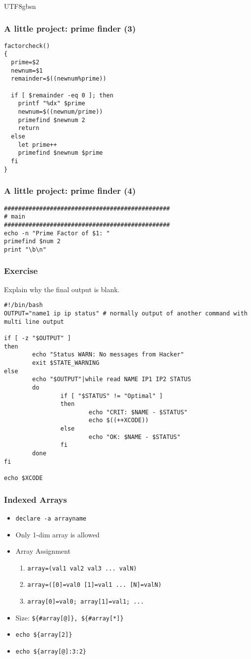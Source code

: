 \documentclass[red]{beamer}
\newcommand*{\lstverb}{\lstinline[style=caret]}
\begin{document}
\begin{CJK*}{UTF8}{gbsn}
\begin{frame}
\frametitle{A little project: prime finder (3)}
\begin{lstlisting}
factorcheck()
{
  prime=$2
  newnum=$1
  remainder=$((newnum%prime))

  if [ $remainder -eq 0 ]; then
    printf "%dx" $prime
    newnum=$((newnum/prime))
    primefind $newnum 2
    return
  else
    let prime++
    primefind $newnum $prime
  fi
}
\end{lstlisting}
\end{frame}

\begin{frame}
\frametitle{A little project: prime finder (4)}
\begin{lstlisting}
###############################################
# main
###############################################
echo -n "Prime Factor of $1: "
primefind $num 2
print "\b\n"
\end{lstlisting}
\end{frame}

\begin{frame}
\frametitle{Exercise}
Explain why the final output is blank.
\begin{lstlisting}[basicstyle=\scriptsize\ttfamily]
#!/bin/bash
OUTPUT="name1 ip ip status" # normally output of another command with multi line output

if [ -z "$OUTPUT" ]
then
        echo "Status WARN: No messages from Hacker"
        exit $STATE_WARNING
else
        echo "$OUTPUT"|while read NAME IP1 IP2 STATUS
        do
                if [ "$STATUS" != "Optimal" ]
                then
                        echo "CRIT: $NAME - $STATUS"
                        echo $((++XCODE))
                else
                        echo "OK: $NAME - $STATUS"
                fi
        done
fi

echo $XCODE
\end{lstlisting}
\end{frame}

\begin{frame}
\frametitle{Indexed Arrays}
\begin{itemize}
	\item \lstverb|declare -a arrayname|
	\item Only 1-dim array is allowed
	\item Array Assignment
	\begin{enumerate}
		\item \lstverb|array=(val1 val2 val3 ... valN)|
		\item \lstverb|array=([0]=val0 [1]=val1 ... [N]=valN)|
		\item \lstverb|array[0]=val0; array[1]=val1; ...|
	\end{enumerate}
	\item Size: \lstverb|${#array[@]}, ${#array[*]}|
	\item \lstverb|echo ${array[2]}|
	\item \lstverb|echo ${array[@]:3:2}| 
\end{itemize}
\end{frame}


\end{CJK*}
\end{document}
